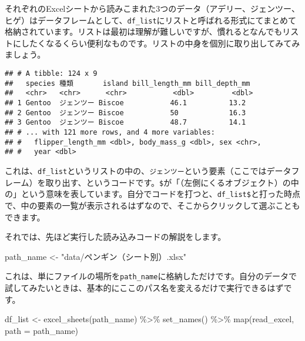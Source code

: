 \documentclass[
  xelatex,ja=standard, b5paper]{bxjsbook}
\newenvironment{Shaded}{\begin{snugshade}}{\end{snugshade}}
\newcommand{\AttributeTok}[1]{\textcolor[rgb]{0.77,0.63,0.00}{#1}}
\newcommand{\FunctionTok}[1]{\textcolor[rgb]{0.00,0.00,0.00}{#1}}
\newcommand{\NormalTok}[1]{#1}
\newcommand{\OtherTok}[1]{\textcolor[rgb]{0.56,0.35,0.01}{#1}}
\newcommand{\SpecialCharTok}[1]{\textcolor[rgb]{0.00,0.00,0.00}{#1}}
\newcommand{\StringTok}[1]{\textcolor[rgb]{0.31,0.60,0.02}{#1}}
\begin{document}
それぞれのExcelシートから読みこまれた3つのデータ（アデリー、ジェンツー、ヒゲ）はデータフレームとして、\texttt{df\_list}にリストと呼ばれる形式にてまとめて格納されています。リストは最初は理解が難しいですが、慣れるとなんでもリストにしたくなるくらい便利なものです。リストの中身を個別に取り出してみてみましょう。

\begin{Shaded}
\end{Shaded}

\begin{verbatim}
## # A tibble: 124 x 9
##   species 種類       island bill_length_mm bill_depth_mm
##   <chr>   <chr>      <chr>           <dbl>         <dbl>
## 1 Gentoo  ジェンツー Biscoe           46.1          13.2
## 2 Gentoo  ジェンツー Biscoe           50            16.3
## 3 Gentoo  ジェンツー Biscoe           48.7          14.1
## # ... with 121 more rows, and 4 more variables:
## #   flipper_length_mm <dbl>, body_mass_g <dbl>, sex <chr>,
## #   year <dbl>
\end{verbatim}

これは、\texttt{df\_list}というリストの中の、\texttt{ジェンツー}という要素（ここではデータフレーム）を取り出す、というコードです。\texttt{\$}が「（左側にくるオブジェクト）の中の」という意味を表しています。自分でコードを打つと、\texttt{df\_list\$}と打った時点で、中の要素の一覧が表示されるはずなので、そこからクリックして選ぶこともできます。

それでは、先ほど実行した読み込みコードの解説をします。

\begin{Shaded}
\begin{Highlighting}[]
\NormalTok{path\_name }\OtherTok{\textless{}{-}} \StringTok{"data/ペンギン（シート別）.xlsx"}
\end{Highlighting}
\end{Shaded}

これは、単にファイルの場所を\texttt{path\_name}に格納しただけです。自分のデータで試してみたいときは、基本的にここのパス名を変えるだけで実行できるはずです。

\begin{Shaded}
\begin{Highlighting}[]
\NormalTok{df\_list }\OtherTok{\textless{}{-}}
  \FunctionTok{excel\_sheets}\NormalTok{(path\_name) }\SpecialCharTok{\%\textgreater{}\%}                    
  \FunctionTok{set\_names}\NormalTok{() }\SpecialCharTok{\%\textgreater{}\%}                           
  \FunctionTok{map}\NormalTok{(read\_excel, }\AttributeTok{path =}\NormalTok{  path\_name) }
\end{Highlighting}
\end{Shaded}
\end{document}
